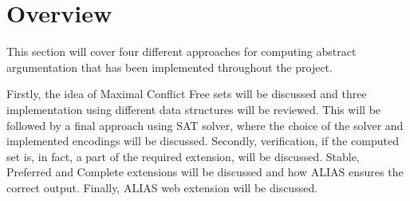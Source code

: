 \section{Overview}
This section will cover four different approaches for computing abstract argumentation that has been implemented throughout the project. 

Firstly, the idea of Maximal Conflict Free sets will be discussed and three implementation using different data structures will be reviewed. This will be followed by a final approach using SAT solver, where the choice of the solver and implemented encodings will be discussed. Secondly, verification, if the computed set is, in fact, a part of the required extension, will be discussed. Stable, Preferred and Complete extensions will be discussed and how ALIAS ensures the correct output. Finally, ALIAS web extension will be discussed.